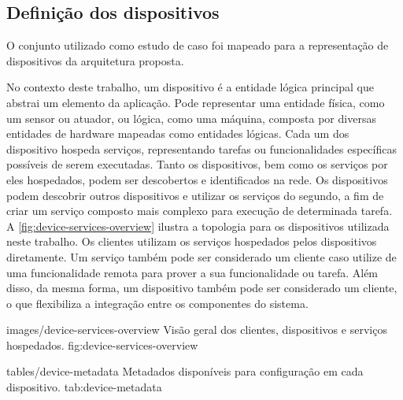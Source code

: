 \subsection{Definição dos dispositivos}

O conjunto utilizado como estudo de caso foi mapeado para a representação de dispositivos da
arquitetura proposta.

No contexto deste trabalho, um dispositivo é a entidade lógica principal que abstrai um elemento da
aplicação. Pode representar uma entidade física, como um sensor ou atuador, ou lógica, como uma
máquina, composta por diversas entidades de hardware mapeadas como entidades lógicas. Cada um dos
dispositivo hospeda serviços, representando tarefas ou funcionalidades específicas possíveis de
serem executadas. Tanto os dispositivos, bem como os serviços por eles hospedados, podem ser
descobertos e identificados na rede. Os dispositivos podem descobrir outros dispositivos e utilizar
os serviços do segundo, a fim de criar um serviço composto mais complexo para execução de
determinada tarefa. A \cref{fig:device-services-overview} ilustra a topologia para os dispositivos
utilizada neste trabalho. Os clientes utilizam os serviços hospedados pelos dispositivos
diretamente. Um serviço também pode ser considerado um cliente caso utilize de uma funcionalidade
remota para prover a sua funcionalidade ou tarefa. Além disso, da mesma forma, um dispositivo também
pode ser considerado um cliente, o que flexibiliza a integração entre os componentes do sistema.

    {images/device-services-overview}
    {Visão geral dos clientes, dispositivos e serviços hospedados.}
    {fig:device-services-overview}

\iffalse
O modelo de dispositivos empregados neste estudo é apresentado na figura\todo{Incluir figura}. Nela,
o dispositivo físico é abstraído por um dispositivo lógico, identificado por\textit{XX*}. O
dispositivo lógico inclui alguns serviços padrão, referenciando funcionalidades que podem ser
encontradas em todos os dispositivos presentes na arquitetura proposta. Dentre os serviços padrão,
tem-se o serviço de implantação de novos serviços. Este serviço permite que outros serviços sejam
adicionados ao dispositivo físico. Além disso, é possível a implantação de novos dispositivos
lógicos, a fim de abstrair componentes da aplicação, juntamente com serviços do
usuário\todo{Melhorar o texto com base na imagem que será incluída.}.
\fi

  {tables/device-metadata}
  {Metadados disponíveis para configuração em cada dispositivo.}
  {tab:device-metadata}

